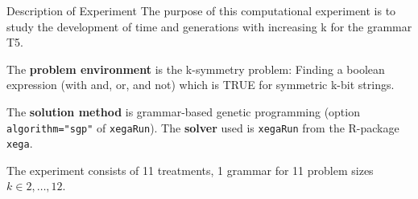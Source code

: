 \begin{frame}
\vspace*{2mm}
\begin{block}{
Description of Experiment
}
The purpose of this computational experiment is to study
the development of time and generations with increasing k
for the grammar T5.
 
The {\bf problem environment} is the k-symmetry problem: 
Finding a boolean expression (with and, or, and not)
which is TRUE for symmetric k-bit strings.
 
The {\bf solution method} is grammar-based genetic programming
(option {\tt algorithm="sgp"}  of {\tt xegaRun}).
The {\bf solver} used is {\tt xegaRun} from the R-package {\tt xega}.
 
The experiment consists of 11 treatments, 1 grammar for 11 problem sizes $k\in 2,\dots, 12$.
\end{block}
\end{frame}